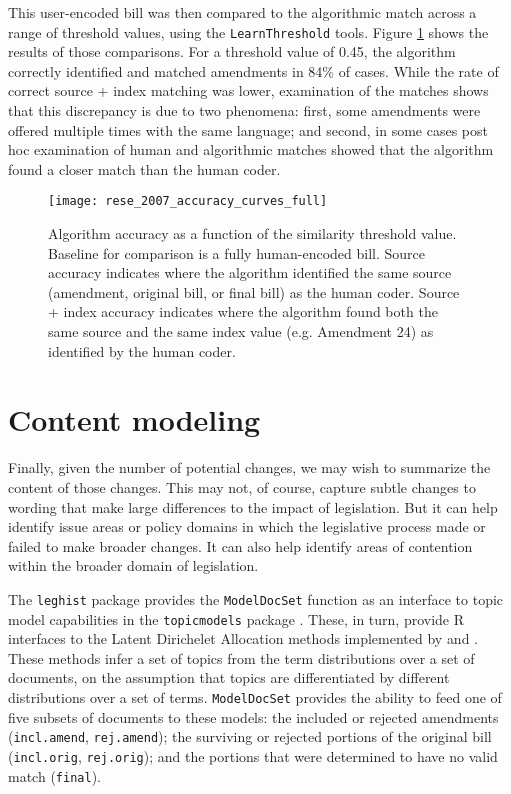 \documentclass[11pt]{article}
\begin{document}
This user-encoded bill was then compared to the algorithmic match
across a range of threshold values, using the \texttt{LearnThreshold}
tools. Figure \ref{fig:rese-accuracy-test} shows the results of those
comparisons. For a threshold value of 0.45, the algorithm correctly
identified and matched amendments in 84\% of cases. While the rate of
correct source + index matching was lower, examination of the matches
shows that this discrepancy is due to two phenomena: first, some
amendments were offered multiple times with the same language; and
second, in some cases post hoc examination of human and algorithmic
matches showed that the algorithm found a closer match than the human
coder.

\begin{figure}[ht]
  \centering
  \texttt{[image: rese\_2007\_accuracy\_curves\_full]}
  \caption{Algorithm accuracy as a function of the similarity threshold value. Baseline for comparison is a fully human-encoded bill. Source accuracy indicates where the algorithm identified the same source (amendment, original bill, or final bill) as the human coder. Source + index accuracy indicates where the algorithm found both the same source and the same index value (e.g. Amendment 24) as identified by the human coder.  }
  \label{fig:rese-accuracy-test}
\end{figure}

\section{Content modeling}
\label{sec:content-modeling}

Finally, given the number of potential changes, we may wish to
summarize the content of those changes. This may not, of course,
capture subtle changes to wording that make large differences to the
impact of legislation. But it can help identify issue areas or policy
domains in which the legislative process made or failed to make
broader changes. It can also help identify areas of contention within
the broader domain of legislation. 

The \texttt{leghist} package provides the \texttt{ModelDocSet}
function as an interface to topic model capabilities in the
\texttt{topicmodels} package \citep{grun2011topicmodels}. These, in
turn, provide R interfaces to the Latent Dirichelet Allocation methods
implemented by \cite{blei2003latent} and
\cite{blei2006correlated}. These methods infer a set of topics from
the term distributions over a set of documents, on the assumption that
topics are differentiated by different distributions over a set of
terms. \texttt{ModelDocSet} provides the ability to feed one of five
subsets of documents to these models: the included or rejected
amendments (\texttt{incl.amend}, \texttt{rej.amend}); the surviving or rejected portions of the original
bill (\texttt{incl.orig}, \texttt{rej.orig}); and the portions that
were determined to have no valid match (\texttt{final}). 
\end{document}

